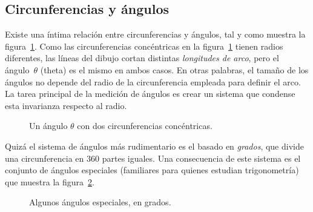   \subsection{Circunferencias y ángulos} %
  \label{sec:circles_and_angles}

Existe una íntima relación entre circunferencias y ángulos, tal y como muestra la figura~\ref{fig:angle_arclength}. Como las circunferencias concéntricas en la figura~\ref{fig:angle_arclength} tienen radios diferentes, las líneas del dibujo cortan distintas \emph{longitudes de arco}, pero el ángulo~$\theta$ (theta) es el mismo en ambos casos. En otras palabras, el tamaño de los ángulos no depende del radio de la circunferencia empleada para definir el arco. La tarea principal de la medición de ángulos es crear un sistema que condense esta invarianza respecto al radio.

\begin{figure}
\begin{center}
\end{center}
\caption{Un ángulo $\theta$ con dos circunferencias concéntricas.\label{fig:angle_arclength}}
\end{figure}

Quizá el sistema de ángulos más rudimentario es el basado en  \emph{grados}, que divide una circunferencia en 360 partes iguales. Una consecuencia de este sistema es el conjunto de ángulos especiales (familiares para quienes estudian trigonometría) que muestra la figura~\ref{fig:degree_angles}.

\begin{figure}
\begin{center}
\end{center}
\caption{Algunos ángulos especiales, en grados.\label{fig:degree_angles}}
\end{figure}

